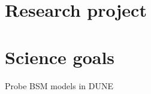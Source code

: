 \documentclass[a4paper,10pt,epsfig,epsf,amsfonts,amsmath]{article}
\begin{document}

\vspace{3cm}


\vspace{0.7cm}



\newpage

\section*{Research project}

\section{Science goals}
Probe BSM models in DUNE
\end{document}
